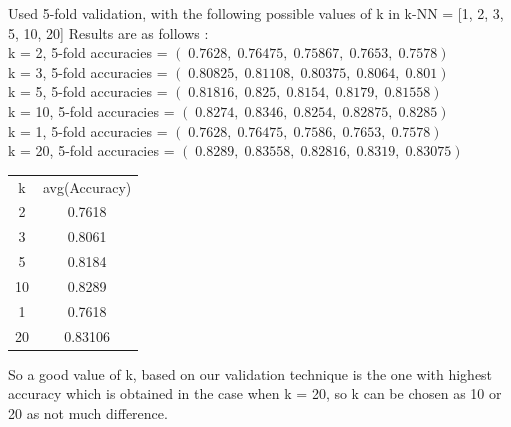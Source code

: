 \documentclass[a4paper,11pt]{article}
\begin{document}
\begin{mlsolution}
Used 5-fold validation, with the following possible values of k in k-NN = [1, 2, 3, 5, 10, 20]
Results are as follows : 
\\ k = 2, 5-fold accuracies = \begin{math} \left ( \; 0.7628, \; 0.76475, \; 0.75867, \; 0.7653, \; 0.7578 \right ) \end{math}
\\ k = 3, 5-fold accuracies = \begin{math} \left ( \; 0.80825, \; 0.81108, \; 0.80375, \; 0.8064, \; 0.801 \right ) \end{math}
\\ k = 5, 5-fold accuracies = \begin{math} \left ( \; 0.81816, \; 0.825, \; 0.8154, \; 0.8179, \; 0.81558 \right ) \end{math}
\\ k = 10, 5-fold accuracies = \begin{math} \left ( \; 0.8274, \;0.8346, \;0.8254, \;0.82875, \;0.8285 \right ) \end{math}
\\ k = 1, 5-fold accuracies = \begin{math} \left ( \; 0.7628, \;0.76475, \;0.7586, \;0.7653, \;0.7578 \right ) \end{math}
\\ k = 20, 5-fold accuracies = \begin{math} \left ( \; 0.8289, \;0.83558, \;0.82816, \;0.8319, \;0.83075 \right ) \end{math}

\begin{center}
 \begin{tabular}{|c|c|} 
 \hline
 k & avg(Accuracy) \\ [0.5ex] 
 2 & 0.7618 \\ 
 3 & 0.8061   \\
 5 & 0.8184   \\
 10 & 0.8289   \\
 1 & 0.7618   \\
 20 & 0.83106   \\ [1ex] 
 \hline
\end{tabular}
\end{center}

So a good value of k, based on our validation technique is the one with highest accuracy which is obtained in the case when k = 20, so k can be chosen as 10 or 20 as not much difference.

\newpage


\end{mlsolution}
\end{document}
